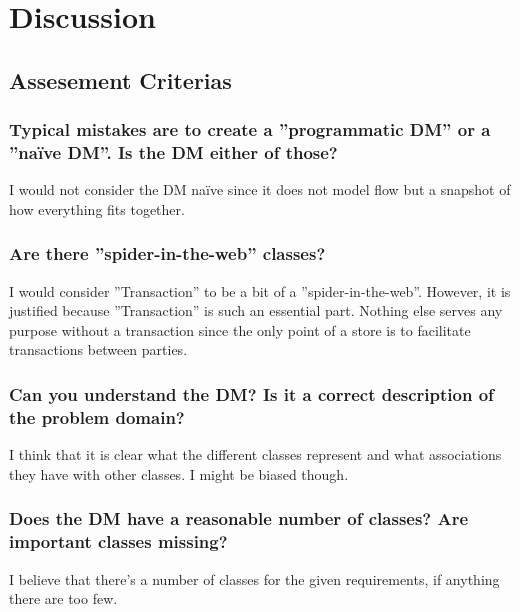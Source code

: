 \documentclass[a4paper]{scrreprt}
\begin{document}
\chapter{Discussion}

    \section{Assesement Criterias}
        \subsection{Typical mistakes are to create a ''programmatic DM'' or a ''naïve DM''. Is the DM either of those?}
            I would not consider the DM naïve since it does not model flow but a
            snapshot of how everything fits together.

        \subsection{Are there ''spider-in-the-web'' classes?}
            I would consider ''Transaction'' to be a bit of a ''spider-in-the-web''.
            However, it is justified because ''Transaction'' is such an essential
            part. Nothing else serves any purpose without a transaction since the
            only point of a store is to facilitate transactions between parties.
            
        \subsection{Can you understand the DM? Is it a correct description of the problem domain?}
            I think that it is clear what the different classes represent and what
            associations they have with other classes. I might be biased though.

        \subsection{Does the DM have a reasonable number of classes? Are important classes missing?}
            I believe that there's a  number of classes for the given
            requirements, if anything there are too few.
\end{document}
